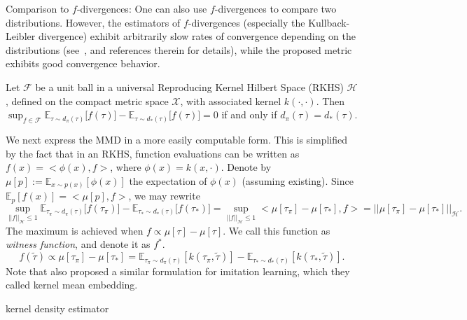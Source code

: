 Comparison to $f$-divergences: One can also use $f$-divergences to compare two distributions.
However, the estimators of $f$-divergences (especially the Kullback-Leibler divergence) exhibit arbitrarily slow rates of convergence depending on the distributions (see~\citep{wang2005divergence,nguyen2008estimating}, and references therein for details), 
while the proposed metric exhibits good convergence behavior.

\begin{theorem}\citep{gretton2007kernel} 
Let $\mathcal{F}$ be a unit ball in a universal Reproducing Kernel Hilbert Space (RKHS) $\mathcal{H}$, defined on the compact metric space $\mathcal{X}$, with associated kernel $k(\cdot, \cdot)$. Then $\sup_{f\in\mathcal{F}} \mathbb{E}_{\tau\sim d_{\pi}(\tau)} \big[ f(\tau) \big] - \mathbb{E}_{\tau\sim d_*(\tau)} \big[f(\tau) \big]=0$ if and only if $d_{\pi}(\tau)=d_{*}(\tau)$. 
\end{theorem}

We next express the MMD in a more easily computable form. 
This is simplified by the fact that in an RKHS, function evaluations can be written as $f(x)=<\phi(x), f>$, where $\phi(x)=k(x, \cdot)$. 
Denote by $\mu[p]:=\mathbb{E}_{x\sim p(x)}[\phi(x)]$ the expectation of $\phi(x)$ (assuming existing). 
Since $\mathbb{E}_{p}[f(x)] = <\mu[p], f>$, we may rewrite 
\begin{equation*}
\sup_{||f||_{\mathcal{H}}\leq 1} \mathbb{E}_{\tau_{\pi}\sim d_{\pi}(\tau)} \big[ f(\tau_{\pi}) \big] - \mathbb{E}_{\tau_{*}\sim d_*(\tau)} \big[f(\tau_{*}) \big] = \sup_{||f||_{\mathcal{H}}\leq 1} <\mu[\tau_{\pi}]-\mu[\tau_{*}], f> = || \mu[\tau_{\pi}] - \mu[\tau_{*}] ||_{\mathcal{H}}. 
\end{equation*}
The maximum is achieved when $f \propto \mu[\tau] - \mu[\tau]$.
We call this function as \textit{witness function}, and denote it as $f^{*}$. 
\begin{equation}
f(\tilde{\tau}) \propto \mu[\tau_{\pi}] - \mu [\tau_{*}] = \mathbb{E}_{\tau_{\pi}\sim d_{\pi}(\tau)}[k(\tau_{\pi}, \tilde{\tau})] - \mathbb{E}_{\tau_{*}\sim d_{*}(\tau)}[k(\tau_{*}, \tilde{\tau})].
\end{equation}
Note that \citet{kim2018imitation} also proposed a similar formulation for imitation learning, which they called kernel mean embedding. 

kernel density estimator

